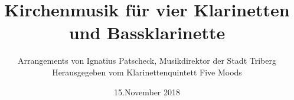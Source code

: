 \documentclass[oneside]{book}
\begin{document}
\author{\huge{\textsf{Arrangements von Ignatius Patscheck, Musikdirektor der Stadt Triberg}}\\[5mm]
\huge{\textsf{Herausgegeben vom Klarinettenquintett {Five Moods}}}}
\title{\Huge{\textsf{Kirchenmusik f\"{u}r vier Klarinetten und Bassklarinette}}}
\date{15.November 2018}
{%
\parindent 0pt
\noindent
\ifx\preLilyPondExample \undefined
\else
  \expandafter\preLilyPondExample
\fi
\def\lilypondbook{}%
%
\ifx\postLilyPondExample \undefined
\else
  \expandafter\postLilyPondExample
\fi
}
\end{document}
